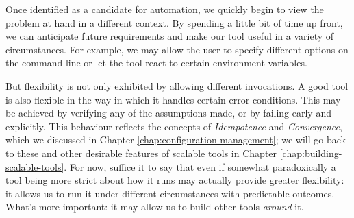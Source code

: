 %
%
%
%
%
%

Once identified as a candidate for automation, we
quickly begin to view the problem at hand in a
different context.  By spending a little bit of time
up front, we can anticipate future requirements and
make our tool useful in a variety of circumstances.
For example, we may allow the user to specify
different options on the command-line or let the tool
react to certain environment variables.

But flexibility is not only exhibited by allowing
different invocations.  A good tool is also flexible
in the way in which it handles certain error
conditions.  This may be achieved by verifying any of
the assumptions made, or by failing early and
explicitly.  This behaviour reflects the concepts of
{\em Idempotence} and {\em
Convergence}, which we discussed in
Chapter \ref{chap:configuration-management}; we will
go back to these and other desirable features of
scalable tools in Chapter
\ref{chap:building-scalable-tools}.  For now, suffice
it to say that even if somewhat paradoxically a tool
being more strict about how it runs may actually
provide greater flexibility: it allows us to run it
under different circumstances with predictable
outcomes.  What's more important: it may allow us to
build other tools {\em around} it.

